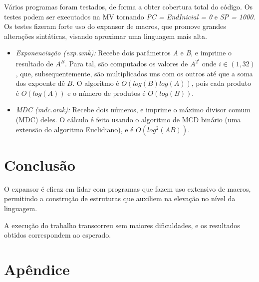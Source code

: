 \documentclass[12pt, a4paper]{article}
\begin{document}
Vários programas foram testados, de forma a obter cobertura total do código. Os testes podem ser executados na MV tornando \emph{PC = EndInicial = 0} e \emph{SP = 1000}. Os testes fizeram forte uso do expansor de macros, que promove grandes alterações sintáticas, visando aproximar uma linguagem mais alta.

\begin{itemize}
	\item \emph{Exponenciação (exp.amk):} Recebe dois parâmetros \emph{A} e \emph{B}, e imprime o resultado de $A^B$. Para tal, são computados os valores de $A^{2^i}$ onde $i \in (1, 32)$, que, subsequentemente, são multiplicados uns com os outros até que a soma dos expoente dê $B$. O algoritmo é $O(log(B) log(A))$, pois cada produto é $O(log(A))$ e o número de produtos é $O(log(B))$.
	\item \emph{MDC (mdc.amk):} Recebe dois números, e imprime o máximo divisor comum (MDC) deles. O cálculo é feito usando o algoritmo de MCD binário (uma extensão do algoritmo Euclidiano), e é $O(log^2(AB))$.
\end{itemize}

\section{Conclusão}

O expansor é eficaz em lidar com programas que fazem uso extensivo de macros, permitindo a construção de estruturas que auxiliem na elevação no nível da linguagem.

A execução do trabalho transcorreu sem maiores dificuldades, e os resultados obtidos correspondem ao esperado.

\appendix
\section{Apêndice}
\end{document}
